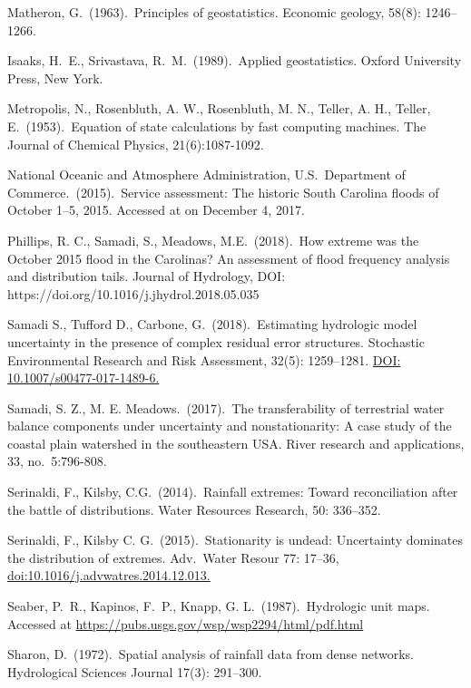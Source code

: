 \begin{thebibliography}{9}
Matheron, G.\ (1963).\ Principles of geostatistics.
Economic geology, 58(8): 1246--1266.

Isaaks, H.\ E., Srivastava, R.\ M.\ (1989).\ Applied geostatistics.
Oxford University Press, New York.

Metropolis, N., Rosenbluth, A. W., Rosenbluth, M. N., Teller, A. H., Teller, E.\ (1953).\
Equation of state calculations by fast computing machines.
The Journal of Chemical Physics, 21(6):1087-1092.

National Oceanic and Atmosphere Administration, U.S.\ Department of Commerce.\ (2015).\
Service assessment: The historic South Carolina floods of October 1--5, 2015.
Accessed at  on December 4, 2017.

\bibitem{phillips}
Phillips, R. C., Samadi, S., Meadows, M.E.\ (2018).\ How extreme was the October 2015 flood in the Carolinas?
An assessment of flood frequency analysis and distribution tails.
Journal of Hydrology, DOI: https://doi.org/10.1016/j.jhydrol.2018.05.035

\bibitem{samadi2}
Samadi S., Tufford D., Carbone, G.\ (2018).\
Estimating hydrologic model uncertainty in the presence of complex residual error structures.
Stochastic Environmental Research and Risk Assessment, 32(5): 1259--1281. \url{DOI: 10.1007/s00477-017-1489-6.}

\bibitem{samadi}
Samadi, S. Z.,  M. E. Meadows.\ (2017).\
The transferability of terrestrial water balance components under uncertainty and nonstationarity:
A case study of the coastal plain watershed in the southeastern USA\@.
River research and applications, 33, no.\ 5:796-808.

\bibitem{reviewer2}
Serinaldi, F., Kilsby, C.G.\ (2014).\
Rainfall extremes: Toward reconciliation after the battle of distributions.
Water Resources Research, 50: 336--352.

\bibitem{seaber}
Serinaldi, F.,  Kilsby C. G.\ (2015).\
Stationarity is undead: Uncertainty dominates the distribution of extremes.
Adv.\ Water Resour 77: 17--36, \url{doi:10.1016/j.advwatres.2014.12.013.}

Seaber, P.\ R., Kapinos, F.\ P.,  Knapp, G. L.\ (1987).\ Hydrologic unit maps.
Accessed at \url{https://pubs.usgs.gov/wsp/wsp2294/html/pdf.html}

\bibitem{new24}
Sharon, D.\ (1972).\ Spatial analysis of rainfall data from dense networks.
 Hydrological Sciences Journal 17(3): 291--300.


\end{thebibliography}
